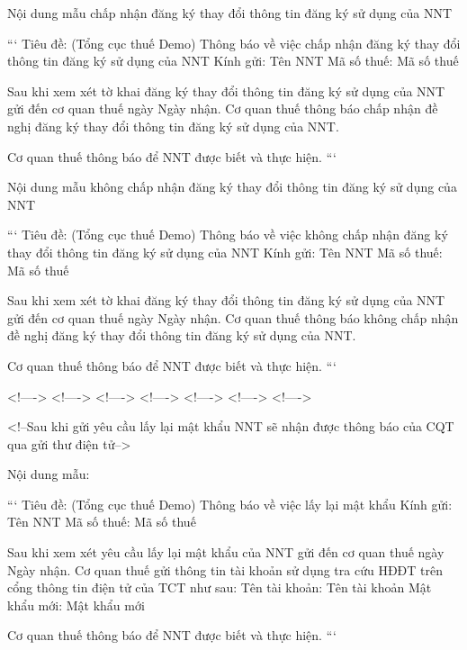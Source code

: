Nội dung mẫu chấp nhận đăng ký thay đổi thông tin đăng ký sử dụng của NNT

```
Tiêu đề: (Tổng cục thuế Demo) Thông báo về việc chấp nhận đăng ký thay đổi thông tin đăng ký sử dụng của NNT
Kính gửi: {{Tên NNT}}
Mã số thuế: {{Mã số thuế}}

Sau khi xem xét tờ khai đăng ký thay đổi thông tin đăng ký sử dụng của NNT gửi đến cơ quan thuế ngày {{Ngày nhận}}.
Cơ quan thuế thông báo chấp nhận đề nghị đăng ký thay đổi thông tin đăng ký sử dụng của NNT.

Cơ quan thuế thông báo để NNT được biết và thực hiện.
```

Nội dung mẫu không chấp nhận đăng ký thay đổi thông tin đăng ký sử dụng của NNT

```
Tiêu đề: (Tổng cục thuế Demo) Thông báo về việc không chấp nhận đăng ký thay đổi thông tin đăng ký sử dụng của NNT
Kính gửi: {{Tên NNT}}
Mã số thuế: {{Mã số thuế}}

Sau khi xem xét tờ khai đăng ký thay đổi thông tin đăng ký sử dụng của NNT gửi đến cơ quan thuế ngày {{Ngày nhận}}.
Cơ quan thuế thông báo không chấp nhận đề nghị đăng ký thay đổi thông tin đăng ký sử dụng của NNT.

Cơ quan thuế thông báo để NNT được biết và thực hiện.
```

<!---->
<!---->
<!---->
<!---->
<!---->
<!---->
<!---->

<!--Sau khi gửi yêu cầu lấy lại mật khẩu NNT sẽ nhận được thông báo của CQT qua gửi thư điện tử-->

Nội dung mẫu:

```
Tiêu đề: (Tổng cục thuế Demo) Thông báo về việc lấy lại mật khẩu
Kính gửi: {{Tên NNT}}
Mã số thuế: {{Mã số thuế}}

Sau khi xem xét yêu cầu lấy lại mật khẩu của NNT gửi đến cơ quan thuế ngày {{Ngày nhận}}.
Cơ quan thuế gửi thông tin tài khoản sử dụng tra cứu HĐĐT trên cổng thông tin điện tử của TCT như sau:
Tên tài khoản: {{Tên tài khoản}}
Mật khẩu mới: {{Mật khẩu mới}}

Cơ quan thuế thông báo để NNT được biết và thực hiện.
```





















